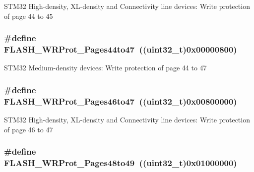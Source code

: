 STM32 High-\/density, XL-\/density and Connectivity line devices: Write protection of page 44 to 45 \hypertarget{group__Option__Bytes__Write__Protection_gaa2d897455d5f71c9fd3721d49b3578fc}{
\subsubsection[{FLASH\_\-WRProt\_\-Pages44to47}]{\setlength{\rightskip}{0pt plus 5cm}\#define FLASH\_\-WRProt\_\-Pages44to47~((uint32\_\-t)0x00000800)}}
\label{group__Option__Bytes__Write__Protection_gaa2d897455d5f71c9fd3721d49b3578fc}
STM32 Medium-\/density devices: Write protection of page 44 to 47 \hypertarget{group__Option__Bytes__Write__Protection_ga8c9bd2510c0af75911a6b24271a33c95}{
\subsubsection[{FLASH\_\-WRProt\_\-Pages46to47}]{\setlength{\rightskip}{0pt plus 5cm}\#define FLASH\_\-WRProt\_\-Pages46to47~((uint32\_\-t)0x00800000)}}
\label{group__Option__Bytes__Write__Protection_ga8c9bd2510c0af75911a6b24271a33c95}
STM32 High-\/density, XL-\/density and Connectivity line devices: Write protection of page 46 to 47 \hypertarget{group__Option__Bytes__Write__Protection_ga12744383aa65b2eb38e37d41a12bb6fe}{
\subsubsection[{FLASH\_\-WRProt\_\-Pages48to49}]{\setlength{\rightskip}{0pt plus 5cm}\#define FLASH\_\-WRProt\_\-Pages48to49~((uint32\_\-t)0x01000000)}}
\label{group__Option__Bytes__Write__Protection_ga12744383aa65b2eb38e37d41a12bb6fe}
